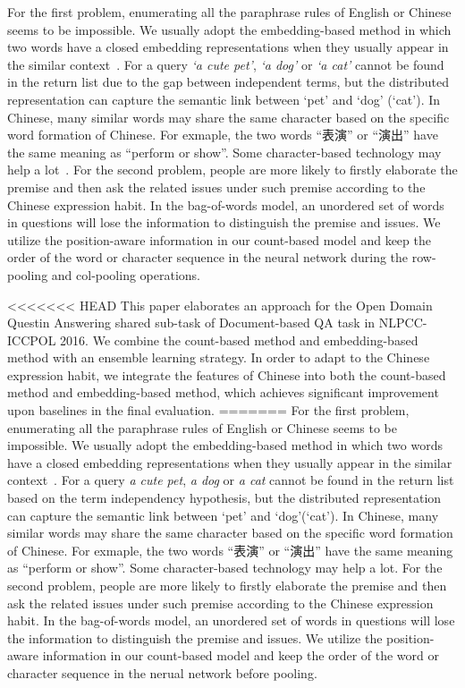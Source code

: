 \documentclass{llncs}
\begin{document}
For the first problem, enumerating all the paraphrase rules of English or Chinese seems to be impossible. We usually adopt the embedding-based method in which two words  have a closed embedding representations when they usually appear in the similar context~\cite{Mikolov2013Distributed}. For a query \emph{`a cute pet'}, \emph{`a dog'} or \emph{`a cat'} cannot be found in the return list due to the gap between independent terms, but the distributed representation can capture the semantic link between `pet' and `dog' (`cat'). In Chinese, many similar words may share the same character based on the specific word formation of Chinese. For exmaple, the two words ``表演'' or ``演出'' have the same meaning as ``perform or show''. Some character-based technology may help a lot~\cite{Sun2014Radical}.  
For the second problem, people are more likely to firstly elaborate the premise and then ask the related issues under such premise according to the Chinese expression habit. In the bag-of-words model, an unordered set of words in questions will lose the information to distinguish the premise and issues.
We utilize the position-aware information in our count-based model and keep the order of the word or character sequence in the neural network during the row-pooling and col-pooling operations. 

<<<<<<< HEAD
This paper elaborates an approach for the Open Domain Questin Answering shared sub-task of Document-based QA task in NLPCC-ICCPOL 2016. We combine the count-based method and embedding-based method with an ensemble learning strategy. In order to adapt to the Chinese expression habit, we integrate the features of Chinese into both the count-based method and embedding-based method, which achieves significant improvement upon baselines in the final evaluation.
=======
For the first problem, enumerating all the paraphrase rules of English or Chinese seems to be impossible. We usually adopt the embedding-based method in which two words  have a closed embedding representations when they usually appear in the similar context~\cite{Mikolov2013Distributed}. For a query \emph{a cute pet}, \emph{a dog} or \emph{a cat} cannot be found in the return list based on the term independency hypothesis, but the distributed representation can capture the semantic link between `pet' and `dog'(`cat'). In Chinese, many similar words may share the same character based on the specific word formation of Chinese. For exmaple, the two words ``表演'' or ``演出'' have the same meaning as ``perform or show''. Some character-based technology may help a lot.  
For the second problem, people are more likely to firstly elaborate the premise and then ask the related issues under such premise according to the Chinese expression habit. In the bag-of-words model, an unordered set of words in questions will lose the information to distinguish the premise and issues.
We utilize the position-aware information in our count-based model and keep the order of the word or character sequence in the nerual network before pooling. 
\end{document}
